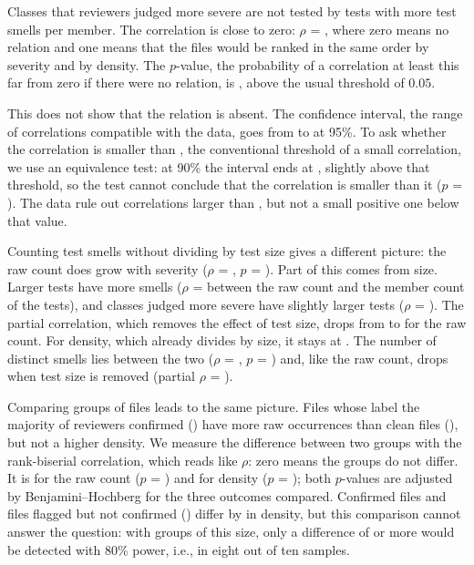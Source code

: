 Classes that reviewers judged more severe are not tested by tests with more test smells
per member. The correlation is close to zero: $\rho$ = \FrhoDensidadeDet{}, where zero
means no relation and one means that the files would be ranked in the same order by
severity and by density. The $p$-value, the probability of a correlation at least this far
from zero if there were no relation, is \FpDensidadeDet{}, above the usual threshold of
$0.05$.

This does not show that the relation is absent. The confidence interval, the range of
correlations compatible with the data, goes from \FicDensidadeBaixo{} to
\FicDensidadeAlto{} at 95\%. To ask whether the correlation is smaller than
\FmargemEquivalencia{}, the conventional threshold of a small correlation, we use an
equivalence test: at
90\% the interval ends at \FmaiorEfeitoDet{}, slightly above that threshold, so the test
cannot conclude that the correlation is smaller than it ($p$ = \FpTostDensidadeDet{}). The
data rule out correlations larger than \FmaiorEfeitoDet{}, but not a small positive one
below that value.

Counting test smells without dividing by test size gives a different picture: the raw
count does grow with severity ($\rho$ = \FrhoBrutoDet{}, $p$ = \FpBrutoDet{}). Part of this
comes from size. Larger tests have more smells ($\rho$ = \FrhoBrutoTamanho{} between the
raw count and the member count of the tests), and classes judged more severe have slightly
larger tests ($\rho$ = \FrhoRotuloMetodos{}). The partial correlation, which removes the
effect of test size, drops from \FrhoBrutoDet{} to \FparcialBruto{} for the raw count. For
density, which already divides by size, it stays at \FparcialDensidade{}. The number of
distinct smells lies between the two ($\rho$ = \FrhoDistintosDet{}, $p$ =
\FpDistintosDet{}) and, like the raw count, drops when test size is removed (partial
$\rho$ = \FparcialDistintos{}).

Comparing groups of files leads to the same picture. Files whose label the majority of
reviewers confirmed (\FnConfirmados{}) have more raw occurrences than clean files
(\FnLimpos{}), but not a higher density. We measure the difference between two groups with
the rank-biserial correlation, which reads like $\rho$: zero means the groups do not
differ. It is \FdeltaBrutoExtremos{} for the raw count ($p$ = \FpajBrutoExtremos{}) and
\FdeltaDensidadeExtremos{} for density ($p$ = \FpajDensidadeExtremos{}); both $p$-values
are adjusted by Benjamini--Hochberg for the three outcomes compared. Confirmed files and
files flagged but not confirmed (\FnDisputados{}) differ by \FdeltaDisputados{} in
density, but this comparison cannot answer the question: with groups of this size, only a
difference of \FdeltaDetectavelDisputados{} or more would be detected with 80\% power,
i.e., in eight out of ten samples.

